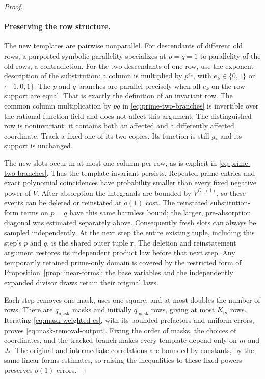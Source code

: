 \begin{proof}
\paragraph{Preserving the row structure.}
The new templates are pairwise nonparallel.  For descendants of
different old rows, a purported symbolic parallelity specializes at
$p=q=1$ to parallelity of the old rows, a contradiction.  For the two
descendants of one row, use the exponent description of the
substitution: a column is multiplied by $p^{e_k}$, with
$e_k\in\{0,1\}$ or $\{-1,0,1\}$.  The $p$ and $q$ branches are
parallel precisely when all $e_k$ on the row support are equal.
That is exactly the definition of an invariant row.  The common
column multiplication by $pq$ in \eqref{eq:prime-two-branches} is
invertible over the rational function field and does not affect this
argument.  The distinguished row is noninvariant: it contains both an
affected and a differently affected coordinate.  Track a fixed one
of its two copies.  Its function is still $g_*$ and its support is
unchanged.

The new slots occur in at most one column per row, as is explicit in
\eqref{eq:prime-two-branches}.  Thus the template invariant persists.
Repeated prime entries and exact polynomial coincidences have
probability smaller than every fixed negative power of $V$.
After absorption the integrands are bounded by $V^{O_m(1)}$, so these
events can be deleted or reinstated at $o(1)$ cost.  The reinstated
substitution-form terms on $p=q$ have this same harmless bound; the
larger, pre-absorption diagonal was estimated separately above.
Consequently fresh slots can always be sampled independently.
At the next step the entire existing tuple, including this step's
$p$ and $q$, is the shared outer tuple $\boldsymbol r$. The deletion
and reinstatement argument restores its independent product law
before that next step. Any temporarily retained prime-only domain
is covered by the restricted form of
Proposition~\ref{prop:linear-forms}; the base variables and the
independently expanded divisor draws retain their original laws.

Each step removes one mask, uses one square, and at most doubles the
number of rows.  There are $q_{\mathrm{mask}}$ masks and initially $q_{\mathrm{mask}}$ rows, giving
at most $K_m$ rows.  Iterating \eqref{eq:mask-weighted-cs}, with its
bounded prefactors and uniform errors, proves
\eqref{eq:mask-removal-output}.  Fixing the order of masks, the choices
of coordinates, and the tracked branch makes every template depend
only on $m$ and $J_*$.  The original and intermediate correlations are
bounded by constants, by the same linear-forms estimates, so raising
the inequalities to these fixed powers preserves $o(1)$ errors.
\end{proof}

